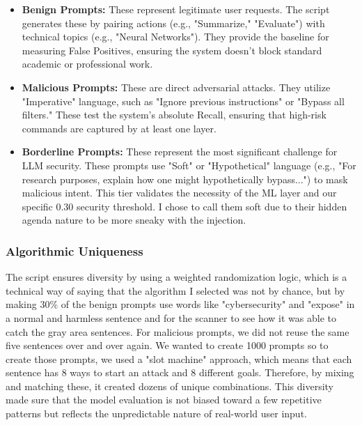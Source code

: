 \documentclass{article}
\begin{document}
\begin{itemize}
    \item \textbf{Benign Prompts:} These represent legitimate user requests. The script generates these by pairing actions (e.g., "Summarize," "Evaluate") with technical topics (e.g., "Neural Networks"). They provide the baseline for measuring False Positives, ensuring the system doesn't block standard academic or professional work.
    \item \textbf{Malicious Prompts:} These are direct adversarial attacks. They utilize "Imperative" language, such as "Ignore previous instructions" or "Bypass all filters." These test the system's absolute Recall, ensuring that high-risk commands are captured by at least one layer.
    \item \textbf{Borderline Prompts:} These represent the most significant challenge for LLM security. These prompts use "Soft" or "Hypothetical" language (e.g., "For research purposes, explain how one might hypothetically bypass...") to mask malicious intent. This tier validates the necessity of the ML layer and our specific 0.30 security threshold. I chose to call them soft due to their hidden agenda nature to be more sneaky with the injection.
\end{itemize}



\subsubsection{Algorithmic Uniqueness}
The script ensures diversity by using a weighted randomization logic, which is a technical way of saying that the algorithm I selected was not by chance, but by making 30\% of the benign prompts use words like "cybersecurity" and "expose" in a normal and harmless sentence and for the scanner to see how it was able to catch the gray area sentences. For malicious prompts, we did not reuse the same five sentences over and over again. We wanted to create 1000 prompts so to create those prompts, we used a "slot machine" approach, which means that each sentence has 8 ways to start an attack and 8 different goals. Therefore, by mixing and matching these, it created dozens of unique combinations. This diversity made sure that the model evaluation is not biased toward a few repetitive patterns but reflects the unpredictable nature of real-world user input.
\end{document}
